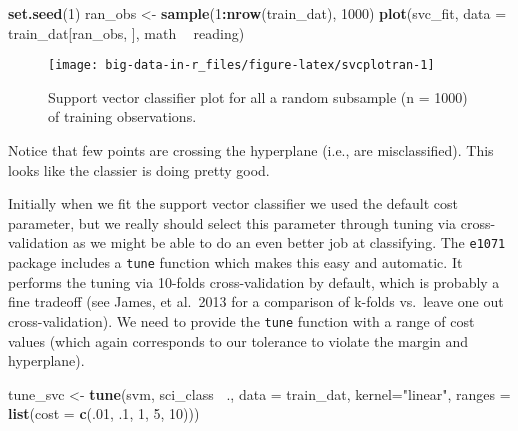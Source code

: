 \documentclass[]{book}
\newenvironment{Shaded}{\begin{snugshade}}{\end{snugshade}}
\newcommand{\DataTypeTok}[1]{\textcolor[rgb]{0.13,0.29,0.53}{#1}}
\newcommand{\DecValTok}[1]{\textcolor[rgb]{0.00,0.00,0.81}{#1}}
\newcommand{\FloatTok}[1]{\textcolor[rgb]{0.00,0.00,0.81}{#1}}
\newcommand{\KeywordTok}[1]{\textcolor[rgb]{0.13,0.29,0.53}{\textbf{#1}}}
\newcommand{\NormalTok}[1]{#1}
\newcommand{\OperatorTok}[1]{\textcolor[rgb]{0.81,0.36,0.00}{\textbf{#1}}}
\newcommand{\StringTok}[1]{\textcolor[rgb]{0.31,0.60,0.02}{#1}}
\begin{document}
\begin{Shaded}
\begin{Highlighting}[]
\KeywordTok{set.seed}\NormalTok{(}\DecValTok{1}\NormalTok{)}
\NormalTok{ran_obs <-}\StringTok{ }\KeywordTok{sample}\NormalTok{(}\DecValTok{1}\OperatorTok{:}\KeywordTok{nrow}\NormalTok{(train_dat), }\DecValTok{1000}\NormalTok{)}
\KeywordTok{plot}\NormalTok{(svc_fit, }\DataTypeTok{data =}\NormalTok{ train_dat[ran_obs, ], math }\OperatorTok{~}\StringTok{ }\NormalTok{reading)}
\end{Highlighting}
\end{Shaded}

\begin{figure}
\texttt{[image: big-data-in-r\_files/figure-latex/svcplotran-1]} \caption{Support vector classifier plot for all a random subsample (n = 1000) of training observations.}\label{fig:svcplotran}
\end{figure}

Notice that few points are crossing the hyperplane (i.e., are misclassified). This looks like the classier is doing pretty good.

Initially when we fit the support vector classifier we used the default cost parameter, but we really should select this parameter through tuning via cross-validation as we might be able to do an even better job at classifying. The \texttt{e1071} package includes a \texttt{tune} function which makes this easy and automatic. It performs the tuning via 10-folds cross-validation by default, which is probably a fine tradeoff (see James, et al.~2013 for a comparison of k-folds vs.~leave one out cross-validation). We need to provide the \texttt{tune} function with a range of cost values (which again corresponds to our tolerance to violate the margin and hyperplane).

\begin{Shaded}
\begin{Highlighting}[]
\NormalTok{tune_svc <-}\StringTok{ }\KeywordTok{tune}\NormalTok{(svm, sci_class }\OperatorTok{~}\NormalTok{., }\DataTypeTok{data =}\NormalTok{ train_dat,}
                 \DataTypeTok{kernel=}\StringTok{"linear"}\NormalTok{,}
                 \DataTypeTok{ranges =} \KeywordTok{list}\NormalTok{(}\DataTypeTok{cost =} \KeywordTok{c}\NormalTok{(.}\DecValTok{01}\NormalTok{, }\FloatTok{.1}\NormalTok{, }\DecValTok{1}\NormalTok{, }\DecValTok{5}\NormalTok{, }\DecValTok{10}\NormalTok{)))}
\end{Highlighting}
\end{Shaded}
\end{document}

